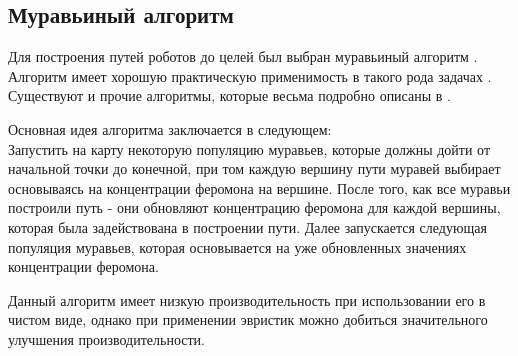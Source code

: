 \documentclass{article}
\numberwithin{equation}{section}
\begin{document}
		\subsection{Муравьиный алгоритм}

			Для построения путей роботов до целей был выбран муравьиный алгоритм \cite{ant}. Алгоритм имеет хорошую практическую применимость в такого рода задачах \cite{ant}\cite{ant1}\cite{ant2}. Существуют и прочие алгоритмы, которые весьма подробно описаны в \cite{path}.

			Основная идея алгоритма заключается в следующем:\\ Запустить на карту некоторую популяцию муравьев, которые должны дойти от начальной точки до конечной, при том каждую вершину пути муравей выбирает основываясь на концентрации феромона на вершине. После того, как все муравьи построили путь - они обновляют концентрацию феромона для каждой вершины, которая была задействована в построении пути. Далее запускается следующая популяция муравьев, которая основывается на уже обновленных значениях концентрации феромона.

			Данный алгоритм имеет низкую производительность при использовании его в чистом виде, однако при применении эвристик можно добиться значительного улучшения производительности.
\end{document}
